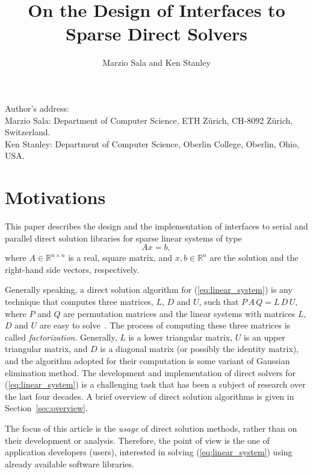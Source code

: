 \documentclass[acmtocl]{acmtrans2m}
\title{On the Design of Interfaces to Sparse Direct Solvers}
\author{Marzio Sala and Ken Stanley}
\begin{document}
\setcounter{page}{1}

\begin{bottomstuff}
Author's address:   \\
Marzio Sala: Department of Computer Science, ETH Z\"urich, CH-8092 Z\"urich,
  Switzerland. \\
Ken Stanley: Department of Computer Science, Oberlin College, Oberlin, Ohio, USA.
\end{bottomstuff}

\maketitle

\section{Motivations}
\label{sec:introduction}

This paper describes the design and the implementation of 
interfaces to serial and parallel direct solution libraries for
sparse linear systems of type
\begin{equation}
  \label{eq:linear_system}
  A x = b,
\end{equation}
where $A \in \mathbb{R}^{n \times n}$ is a real, square matrix, 
  and $x, b \in \mathbb{R}^{n}$ are the solution and
the right-hand side vectors, respectively. 

Generally speaking,
a direct solution algorithm for (\ref{eq:linear_system}) is any 
technique that computes three matrices, $L$, $D$ and $U$, such that
$P\, A\, Q = L \, D \, U$, where $P$ and $Q$ are permutation matrices
and the linear systems with matrices $L$, $D$ and $U$ are
easy to solve~\cite{golub96matrix}. 
The process of computing these three matrices is called {\sl
  factorization}. Generally, $L$ is a lower triangular matrix, $U$ is an
upper triangular matrix, and $D$ is a diagonal matrix 
(or possibly the identity matrix), and the algorithm adopted for their
computation is some variant of Gaussian elimination method.
The development and implementation of
direct solvers for (\ref{eq:linear_system}) is a
challenging task that has been a subject of research over the
last four decades. 
A brief overview of direct solution algorithms  is given in 
Section~\ref{sec:overview}. 

The focus of this article is the {\sl usage} of direct solution methods,
    rather than on their development or analysis.
Therefore, the point of view is the one
of application developers (users), interested in solving
(\ref{eq:linear_system}) using already available software libraries.  
\end{document}
